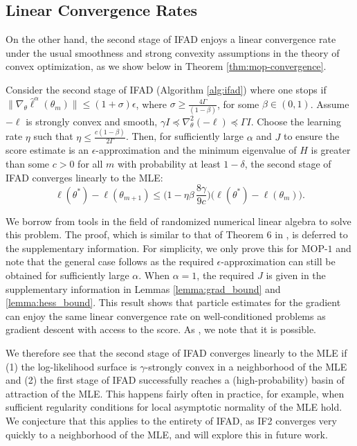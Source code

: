 \documentclass[9pt,twocolumn,pnasresearcharticle]{pnas-new}
\newcommand\arxiv[2]{#2} %
\begin{document}
\subsection{Linear Convergence Rates}

On the other hand, the second stage of IFAD enjoys a linear convergence rate under the usual smoothness and strong convexity assumptions in the theory of convex optimization, as we show below in Theorem \ref{thm:mop-convergence}.

\begin{thm}
    
Consider the second stage of IFAD (Algorithm \ref{alg:ifad}) where one stops if $\|\nabla_\theta \hat\ell^\alpha(\theta_m)\| \leq (1+\sigma) \epsilon$, where $\sigma \geq \frac{4 \Gamma}{(1-\beta)}$, for some $\beta \in (0,1)$. Assume $-\ell$ is strongly convex and smooth, $\gamma I \preceq \nabla_\theta^2 (-\ell) \preceq \Gamma I$. Choose the learning rate $\eta$ such that $\eta \leq \frac{c(1-\beta)}{2\Gamma}$. Then, for sufficiently large $\alpha$ and $J$ to ensure the score estimate is an $\epsilon$-approximation and the minimum eigenvalue of $H$ is greater than some $c > 0$ for all $m$ with probability at least $1-\delta$, the second stage of IFAD converges linearly to the MLE:
\arxiv{}{\vspace*{-2mm}}
$$
\ell(\theta^*) - \ell(\theta_{m+1}) \leq \Big(1-\eta\beta\, \frac{8\gamma}{9c}\Big)\big(\ell(\theta^*)-\ell(\theta_m)\big).
$$
\label{thm:mop-convergence}
\end{thm}
\arxiv{}{\vspace*{-5mm}}
We borrow from tools in the field of randomized numerical linear algebra \cite{mahoney16} to solve this problem. The proof, which is similar to that of Theorem 6 in \cite{mahoney16}, is deferred to \arxiv{Appendix~\ref{appendix:convergence}}{the supplementary information}. For simplicity, we only prove this for MOP-$1$ and note that the general case follows as the required $\epsilon$-approximation can still be obtained for sufficiently large $\alpha$. When $\alpha=1$, the required $J$ is given in the supplementary information in Lemmas \ref{lemma:grad_bound} and \ref{lemma:hess_bound}. This result shows that particle estimates for the gradient can enjoy the same linear convergence rate on well-conditioned problems as gradient descent with access to the score. As , we note that it is possible.

We therefore see that the second stage of IFAD converges linearly to the MLE if (1) the log-likelihood surface is $\gamma$-strongly convex in a neighborhood of the MLE and (2) the first stage of IFAD successfully reaches a (high-probability) basin of attraction of the MLE. This happens fairly often in practice, for example, when sufficient regularity conditions for local asymptotic normality of the MLE hold. We conjecture that this applies to the entirety of IFAD, as IF2 converges very quickly to a neighborhood of the MLE, and will explore this in future work.
\end{document}
